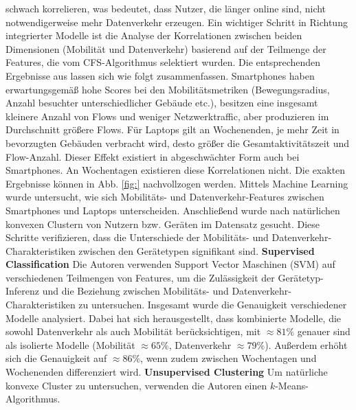 \documentclass[12pt, a4paper]{article}
\begin{document}
schwach korrelieren, was bedeutet, dass Nutzer, die länger online sind, nicht notwendigerweise mehr Datenverkehr erzeugen. \cite{Alipour2018}
\newline\newline
Ein wichtiger Schritt in Richtung integrierter Modelle ist die Analyse der Korrelationen
zwischen beiden Dimensionen (Mobilität und Datenverkehr) basierend auf der Teilmenge der Features,
die vom \textsc{CFS}-Algorithmus selektiert wurden. Die entsprechenden Ergebnisse aus \cite{Alipour2018} lassen sich wie 
folgt zusammenfassen. Smartphones haben erwartungsgemäß hohe Scores bei den Mobilitätsmetriken (Bewegungsradius,
Anzahl besuchter unterschiedlicher Gebäude etc.), besitzen eine
insgesamt kleinere Anzahl von Flows und weniger Netzwerktraffic, aber produzieren im Durchschnitt größere Flows.
Für Laptops gilt an Wochenenden, je mehr Zeit in bevorzugten Gebäuden verbracht wird, desto größer die Gesamtaktivitätszeit
und Flow-Anzahl. Dieser Effekt existiert in abgeschwächter Form auch bei Smartphones. 
An Wochentagen existieren diese Korrelationen nicht. Die exakten Ergebnisse können in Abb. \ref{fig:} nachvollzogen werden.
Mittels Machine Learning wurde untersucht, wie sich Mobilitäts- und Datenverkehr-Features zwischen
Smartphones und Laptops unterscheiden. Anschließend wurde nach natürlichen konvexen Clustern von Nutzern bzw. Geräten im
Datensatz gesucht. Diese Schritte verifizieren, dass die Unterschiede der Mobilitäts- und Datenverkehr-Charakteristiken
zwischen den Gerätetypen signifikant sind.
\newline\newline
\textbf{Supervised Classification}\newline
Die Autoren verwenden Support Vector Maschinen (SVM) auf verschiedenen Teilmengen von Features, 
um die Zulässigkeit der Gerätetyp-Inferenz und die Beziehung zwischen Mobilitäts- und Datenverkehr-Charakteristiken
zu untersuchen. Insgesamt wurde die Genauigkeit verschiedener Modelle analysiert. Dabei hat sich herausgestellt,
dass kombinierte Modelle, die sowohl Datenverkehr als auch Mobilität berücksichtigen, mit $\approx 81 \%$ genauer sind als isolierte Modelle
(Mobilität $\approx 65 \%$, Datenverkehr $\approx 79 \%$). Außerdem erhöht sich die Genauigkeit auf $\approx 86 \%$, wenn
zudem zwischen Wochentagen und Wochenenden differenziert wird.
\newline\newline
\textbf{Unsupervised Clustering}\newline
Um natürliche konvexe Cluster zu untersuchen, verwenden die Autoren einen $k$-Means-Algorithmus.
\end{document}
